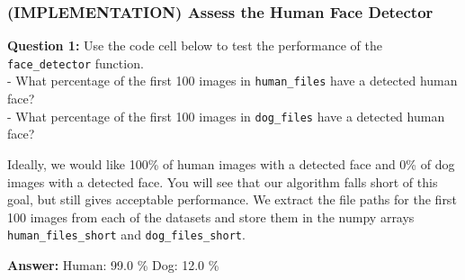 \documentclass[11pt]{article}
\begin{document}
    \subsubsection{(IMPLEMENTATION) Assess the Human Face
Detector}\label{implementation-assess-the-human-face-detector}

\textbf{Question 1:} Use the code cell below to test the performance of
the \texttt{face\_detector} function.\\
- What percentage of the first 100 images in \texttt{human\_files} have
a detected human face?\\
- What percentage of the first 100 images in \texttt{dog\_files} have a
detected human face?

Ideally, we would like 100\% of human images with a detected face and
0\% of dog images with a detected face. You will see that our algorithm
falls short of this goal, but still gives acceptable performance. We
extract the file paths for the first 100 images from each of the
datasets and store them in the numpy arrays \texttt{human\_files\_short}
and \texttt{dog\_files\_short}.

\textbf{Answer:} Human: 99.0 \% Dog: 12.0 \%
\end{document}
